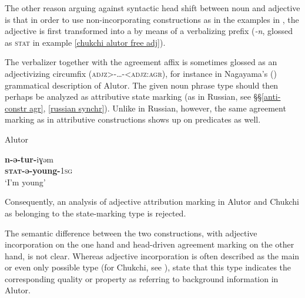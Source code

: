 The other reason arguing against syntactic head shift between noun and adjective is that in order to use non-incorporating constructions as in the examples in , the adjective is first transformed into a  by means of a verbalizing prefix (\textit{-n}, glossed as \textsc{stat} in example \ref{chukchi alutor free adj}).

The verbalizer together with the agreement affix is sometimes glossed as an adjectivizing circumfix (\textsc{adjz>-\dots-<adjz:agr}), for instance in Nagayama's (\citeyear{nagayama2003}) grammatical description of Alutor. The given noun phrase type should then perhaps be analyzed as attributive state marking (as in Russian, see \S\S\ref{anti-constr agr}, \ref{russian synchr}). Unlike in Russian, however, the same agreement marking as in attributive constructions shows up on predicates as well.
\begin{exe}
\ex \rm{Alutor \citep{nagayama2003}}
\begin{xlist}
\ex
\gll	\textbf{n-ə-tur-}iɣəm\\
	\textbf{\textsc{stat}-ə-young-}\textsc{1sg}\\
\glt	‘I'm young’
\end{xlist}
\end{exe}
Consequently, an analysis of adjective attribution marking in Alutor and Chukchi as belonging to the state-marking type is rejected.

The semantic difference between the two constructions, with adjective incorporation on the one hand and head\hyp{}driven agreement marking on the other hand, is not clear. Whereas adjective incorporation is often described as the main or even only possible type (for Chukchi, see \citealt[37, 101]{kampfe-etal1995}), \citet[288]{kibrik-etal2000} state that this type indicates the corresponding quality or property as referring to background information in Alutor.

